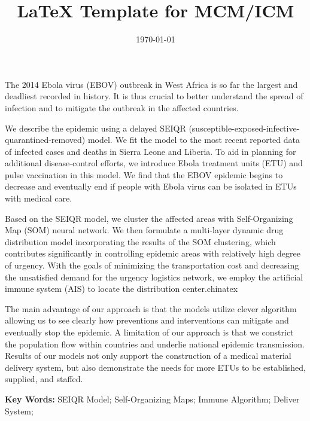 \documentclass{mcmthesis}
\title{\LaTeX{} Template for MCM/ICM }
\author{\team}
\date{\today}
\begin{document}
\begin{summary}
The 2014 Ebola virus (EBOV) outbreak in West Africa is so far the largest and
deadliest recorded in history. It is thus crucial to better understand the spread
of infection and to mitigate the outbreak in the affected countries.

We describe the epidemic using a delayed SEIQR
(susceptible-exposed-infective-quarantined-removed) model.
We fit the model to the most recent reported data of infected cases and deaths in Sierra Leone and Liberia.
To aid in planning for additional disease-control efforts,
we introduce Ebola treatment units (ETU) and pulse vaccination in this model.
We find that the EBOV epidemic begins to decrease and eventually end if people with Ebola
virus can be isolated in ETUs with medical care.

Based on the SEIQR model, we cluster the affected areas with Self-Organizing Map (SOM) neural network.
We then formulate a multi-layer dynamic drug distribution model incorporating the results of the SOM
clustering, which contributes significantly in controlling epidemic areas with
relatively high degree of urgency. With the goals of minimizing the
transportation cost and decreasing the unsatisfied demand for the urgency
logistics network, we employ the artificial immune system (AIS) to locate the
distribution center.chinatex

The main advantage of our approach is that the models utilize clever
algorithm allowing us to see clearly how preventions and interventions can
mitigate and eventually stop the epidemic. A limitation of our approach is
that we constrict the population flow within countries and underlie national
epidemic transmission. Results of our models not only support the
construction of a medical material delivery system, but also demonstrate the
needs for more ETUs to be established, supplied, and staffed.

\noindent
\textbf{Key Words:}
SEIQR Model; Self-Organizing Maps; Immune Algorithm; Deliver System;

\end{summary}


\maketitle



%
\end{document}
